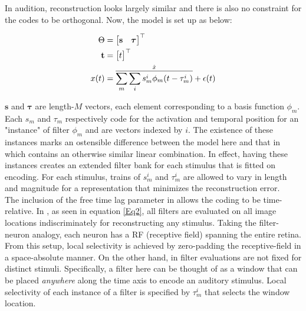 \documentclass[
	a4paper, %
	11pt, %
	unnumberedsections, %
]{LTJournalArticle}
\begin{document}
In audition, reconstruction looks largely similar and there is also no constraint for the codes to be orthogonal. Now, the model is set up as below: 
\begin{center}
  \begin{align}
    \Theta & = \begin{bmatrix}
      \mathbf{s} & \boldsymbol{\tau}
    \end{bmatrix}^{\top}\notag\\
    \mathbf{t} & = \begin{bmatrix}
      t
    \end{bmatrix}^{\top}\notag\\
    x(t) & = \overset{\hat{x}}{\overline{\sum_m\sum_is_m^{i} \phi_m(t - \tau_m^{i})}} + \epsilon(t)\label{Eq3}
  \end{align}
\end{center}
$\mathbf{s}$ and $\boldsymbol{\tau}$ are length-$M$ vectors, each element corresponding to a basis function $\phi_m$. Each $s_m$ and $\tau_m$ respectively code for the activation and temporal position for an "instance" of filter $\phi_m$ and are vectors indexed by $i$. The existence of these instances marks an ostensible difference between the model here and that in \textcite{olshausenSparseCodingOvercomplete1997} which contains an otherwise similar linear combination. In effect, having these instances creates an extended filter bank for each stimulus that is fitted on encoding. For each stimulus, trains of $s_m^i$ and $\tau_m^i$ are allowed to vary in length and magnitude for a representation that minimizes the reconstruction error. \\

The inclusion of the free time lag parameter in \textcite{smithEfficientAuditoryCoding2006} allows the coding to be time-relative. In \textcite{olshausenSparseCodingOvercomplete1997}, as seen in equation \eqref{Eq2}, all filters are evaluated on all image locations indiscriminately for reconstructing any stimulus. Taking the filter-neuron analogy, each neuron has a RF (receptive field) spanning the entire retina. From this setup, local selectivity is achieved by zero-padding the receptive-field in a space-absolute manner. On the other hand, in \textcite{smithEfficientAuditoryCoding2006} filter evaluations are not fixed for distinct stimuli. Specifically, a filter here can be thought of as a window that can be placed \textit{anywhere} along the time axis to encode an auditory stimulus. Local selectivity of each instance of a filter is specified by $\tau_m^i$ that selects the window location. \\
\end{document}
